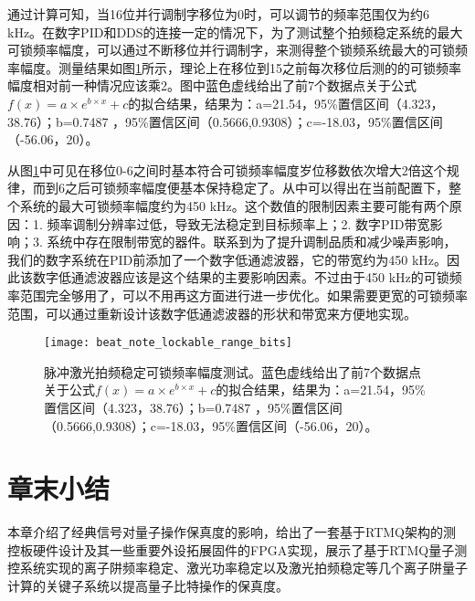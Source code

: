 通过计算可知，当16位并行调制字移位为0时，可以调节的频率范围仅为约6 kHz。在数字PID和DDS的连接一定的情况下，为了测试整个拍频稳定系统的最大可锁频率幅度，可以通过不断移位并行调制字，来测得整个锁频系统最大的可锁频率幅度。测量结果如图\ref{fig:beat_note_lockable_range_bits}所示，理论上在移位到15之前每次移位后测的的可锁频率幅度相对前一种情况应该乘2。图中蓝色虚线给出了前7个数据点关于公式$f(x)=a\times e^{b\times x}+c$的拟合结果，结果为：a=21.54，95\%置信区间（4.323，38.76）；b=0.7487 ，95\%置信区间（0.5666,0.9308）；c=-18.03，95\%置信区间（-56.06，20）。

从图\ref{fig:beat_note_lockable_range_bits}中可见在移位0-6之间时基本符合可锁频率幅度岁位移数依次增大2倍这个规律，而到6之后可锁频率幅度便基本保持稳定了。从中可以得出在当前配置下，整个系统的最大可锁频率幅度约为450 kHz。这个数值的限制因素主要可能有两个原因：1. 频率调制分辨率过低，导致无法稳定到目标频率上；2. 数字PID带宽影响；3. 系统中存在限制带宽的器件。联系到为了提升调制品质和减少噪声影响，我们的数字系统在PID前添加了一个数字低通滤波器，它的带宽约为450 kHz。因此该数字低通滤波器应该是这个结果的主要影响因素。不过由于450 kHz的可锁频率范围完全够用了，可以不用再这方面进行进一步优化。如果需要更宽的可锁频率范围，可以通过重新设计该数字低通滤波器的形状和带宽来方便地实现。




\begin{figure}
    \centering
    \texttt{[image: beat\_note\_lockable\_range\_bits]}
    \caption[脉冲激光拍频稳定可锁频率幅度测试]{脉冲激光拍频稳定可锁频率幅度测试。蓝色虚线给出了前7个数据点关于公式$f(x)=a\times e^{b\times x}+c$的拟合结果，结果为：a=21.54，95\%置信区间（4.323，38.76）；b=0.7487 ，95\%置信区间（0.5666,0.9308）；c=-18.03，95\%置信区间（-56.06，20）。\label{fig:beat_note_lockable_range_bits}}
\end{figure}





\newpage
\section[章末小结]{章末小结}

本章介绍了经典信号对量子操作保真度的影响，给出了一套基于RTMQ架构的测控板硬件设计及其一些重要外设拓展固件的FPGA实现，展示了基于RTMQ量子测控系统实现的离子阱频率稳定、激光功率稳定以及激光拍频稳定等几个离子阱量子计算的关键子系统以提高量子比特操作的保真度。

